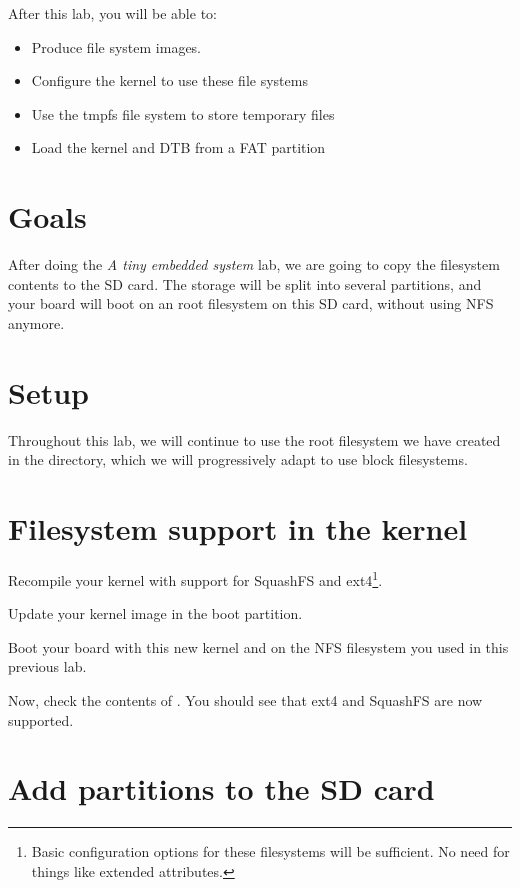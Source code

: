 
After this lab, you will be able to:
\begin{itemize}
\item Produce file system images.
\item Configure the kernel to use these file systems
\item Use the tmpfs file system to store temporary files
\item Load the kernel and DTB from a FAT partition
\end{itemize}

\section{Goals}

After doing the {\em A tiny embedded system} lab, we are going to copy
the filesystem contents to the SD card. The storage will be
split into several partitions, and your board will boot
on an root filesystem on this SD card, without using NFS anymore.

\section{Setup}

Throughout this lab, we will continue to use the root filesystem we
have created in the 
directory, which we will progressively adapt to use block filesystems.

\section{Filesystem support in the kernel}

Recompile your kernel with support for SquashFS and ext4\footnote{Basic
configuration options for these filesystems will be sufficient. No need
for things like extended attributes.}.

Update your kernel image in the boot partition.

Boot your board with this new kernel and on the NFS filesystem you
used in this previous lab.

Now, check the contents of . You should see
 that ext4 and SquashFS are now supported.

\section{Add partitions to the SD card}

